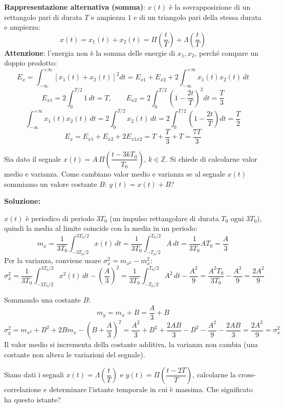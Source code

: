 \documentclass[12pt, a4paper]{article}
\begin{document}
\textbf{Rappresentazione alternativa (somma)}: $x(t)$ è la sovrapposizione di un rettangolo pari di durata $T$ e ampiezza $1$ e di un triangolo pari della stessa durata e ampiezza:
$$x(t) = x_1(t)+x_2(t) = \Pi\!\left(\frac tT\right)+\Lambda\!\left(\frac tT\right)$$
\textbf{Attenzione}: l'energia non è la somma delle energie di $x_1,x_2$, perché compare un doppio prodotto:
$$E_x = \int_{-\infty}^{+\infty}[x_1(t)+x_2(t)]^2dt = E_{x1}+E_{x2}+2\int_{-\infty}^{+\infty}x_1(t)x_2(t)\,dt$$
$$E_{x1}=2\int_0^{T/2}1\,dt=T, \qquad E_{x2}=2\int_0^{T/2}\left(1-\frac{2t}{T}\right)^2dt = \frac T3$$
$$\int_{-\infty}^{+\infty}x_1(t)x_2(t)\,dt = 2\int_0^{T/2}x_2(t)\,dt = 2\int_0^{T/2}\left(1-\frac{2t}{T}\right)dt = \frac T2$$
$$E_x = E_{x1}+E_{x2}+2E_{x1x2} = T+\frac T3+T = \frac{7T}{3}$$

\bigskip

\begin{tcolorbox}[colback=lightergray!10, colframe=tocsec, title=\textbf{Esercizio 6}]
Sia dato il segnale $x(t)=A\,\Pi\!\left(\dfrac{t-3kT_0}{T_0}\right)$, $k\in\mathbb{Z}$. Si chiede di calcolarne valor medio e varianza. Come cambiano valor medio e varianza se al segnale $x(t)$ sommiamo un valore costante $B$: $y(t)=x(t)+B$?
\end{tcolorbox}

\textbf{Soluzione:}

$x(t)$ è periodico di periodo $3T_0$ (un impulso rettangolare di durata $T_0$ ogni $3T_0$), quindi la media al limite coincide con la media in un periodo:
$$m_x = \frac{1}{3T_0}\int_{-3T_0/2}^{3T_0/2}x(t)\,dt = \frac{1}{3T_0}\int_{-T_0/2}^{T_0/2}A\,dt = \frac{1}{3T_0}AT_0=\frac A3$$
Per la varianza, conviene usare $\sigma_x^2=m_{x^2}-m_x^2$:
$$\sigma_x^2 = \frac{1}{3T_0}\int_{-3T_0/2}^{3T_0/2}x^2(t)\,dt-\left(\frac A3\right)^2 = \frac{1}{3T_0}\int_{-T_0/2}^{T_0/2}A^2\,dt-\frac{A^2}{9} = \frac{A^2T_0}{3T_0}-\frac{A^2}9=\frac{2A^2}{9}$$

Sommando una costante $B$:
$$m_y = m_x+B=\frac A3+B$$
$$\sigma_y^2 = m_{x^2}+B^2+2Bm_x-\left(B+\frac A3\right)^2 = \frac{A^2}3+B^2+\frac{2AB}3-B^2-\frac{A^2}9-\frac{2AB}3=\frac{2A^2}9=\sigma_x^2$$
Il valor medio si incrementa della costante additiva, la varianza non cambia (una costante non altera le variazioni del segnale).

\bigskip

\begin{tcolorbox}[colback=lightergray!10, colframe=tocsec, title=\textbf{Esercizio 7}]
Siano dati i segnali $x(t)=\Lambda\!\left(\dfrac tT\right)$ e $y(t)=\Pi\!\left(\dfrac{t-2T}{T}\right)$, calcolarne la cross-correlazione e determinare l'istante temporale in cui è massima. Che significato ha questo istante?
\end{tcolorbox}
\end{document}

